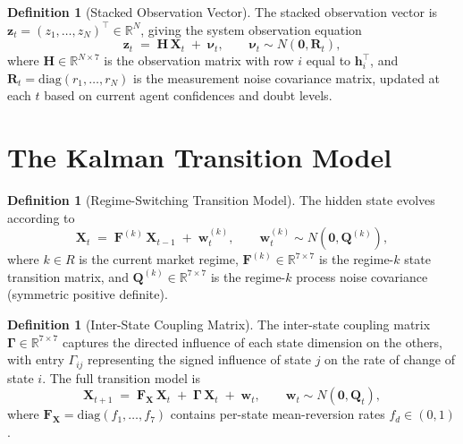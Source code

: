 \documentclass[12pt,openany]{book}
\newcommand{\bfGamma}{\boldsymbol{\Gamma}}
\newcommand{\calR}{\mathcal{R}}
\numberwithin{equation}{chapter}
\theoremstyle{plain}
\theoremstyle{definition}
\newtheorem{definition}[theorem]{Definition}
\theoremstyle{remark}
\def\mathcal#1{#1}%
\begin{document}
\begin{definition}[Stacked Observation Vector]
\label{def:stacked-observation}
The stacked observation vector is
$\mathbf{z}_t = (z_1, \ldots, z_N)^\top \in \mathbb{R}^N$,
giving the system observation equation
\begin{equation}
  \mathbf{z}_t \;=\; \mathbf{H}\,\mathbf{X}_t \;+\; \boldsymbol{\nu}_t,
  \qquad \boldsymbol{\nu}_t \sim \mathcal{N}(\mathbf{0}, \mathbf{R}_t),
  \label{eq:system-observation}
\end{equation}
where $\mathbf{H} \in \mathbb{R}^{N \times 7}$ is the observation
matrix with row $i$ equal to $\mathbf{h}_i^\top$, and
$\mathbf{R}_t = \mathrm{diag}(r_1, \ldots, r_N)$ is the
measurement noise covariance matrix, updated at each $t$ based
on current agent confidences and doubt levels.
\end{definition}

\section{The Kalman Transition Model}

\begin{definition}[Regime-Switching Transition Model]
\label{def:transition-model}
The hidden state evolves according to
\begin{equation}
  \mathbf{X}_t \;=\; \mathbf{F}^{(k)}\,\mathbf{X}_{t-1}
  \;+\; \mathbf{w}_t^{(k)},
  \qquad \mathbf{w}_t^{(k)} \sim \mathcal{N}(\mathbf{0}, \mathbf{Q}^{(k)}),
  \label{eq:transition-model}
\end{equation}
where $k \in \calR$ is the current market regime, $\mathbf{F}^{(k)}
\in \mathbb{R}^{7 \times 7}$ is the regime-$k$ state transition matrix,
and $\mathbf{Q}^{(k)} \in \mathbb{R}^{7 \times 7}$ is the regime-$k$
process noise covariance (symmetric positive definite).
\end{definition}

\begin{definition}[Inter-State Coupling Matrix]
\label{def:coupling-matrix}
The inter-state coupling matrix
$\bfGamma \in \mathbb{R}^{7 \times 7}$ captures the directed influence
of each state dimension on the others, with entry $\Gamma_{ij}$
representing the signed influence of state $j$ on the rate of
change of state $i$.  The full transition model is
\begin{equation}
  \mathbf{X}_{t+1} \;=\; \mathbf{F}_{\mathbf{X}}\,\mathbf{X}_t
  \;+\; \bfGamma\,\mathbf{X}_t \;+\; \mathbf{w}_t,
  \qquad \mathbf{w}_t \sim \mathcal{N}(\mathbf{0}, \mathbf{Q}_t),
  \label{eq:full-transition}
\end{equation}
where $\mathbf{F}_{\mathbf{X}} = \mathrm{diag}(f_1, \ldots, f_7)$
contains per-state mean-reversion rates $f_d \in (0,1)$.
\end{definition}
\end{document}
